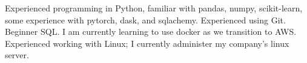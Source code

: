 \documentclass[a4paper]{article}
\begin{document}
Experienced programming in Python, familiar with pandas, numpy, scikit-learn, some experience with pytorch, dask, and sqlachemy. Experienced using Git. Beginner SQL. I am currently learning to use docker as we transition to AWS. Experienced working with Linux; I currently administer my company's linux server.

%
%
%
%
%
%
%
%
\end{document}
